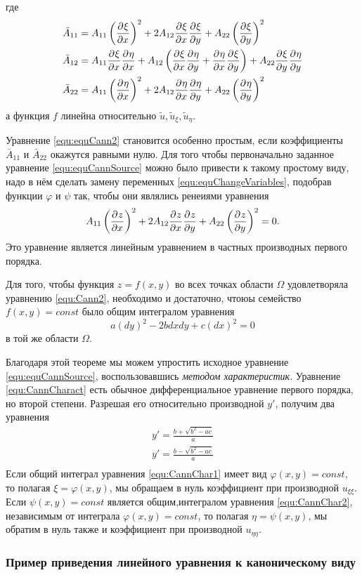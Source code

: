где 
\begin{align*}
	&\bar A_{11} = A_{11} \left(\frac{\partial^{}\xi}{\partial x^{}} \right)^2 + 2 A_{12} \frac{\partial^{}\xi}{\partial x^{}} \frac{\partial^{}\xi}{\partial y^{}} + A_{22} \left(\frac{\partial^{}\xi}{\partial y^{}} \right)^2\\
	&\bar A_{12} = A_{11} \frac{\partial^{}\xi}{\partial x^{}} \frac{\partial^{}\eta}{\partial x^{}} + A_{12} \left( \frac{\partial^{}\xi}{\partial x^{}} \frac{\partial^{}\eta}{\partial y^{}} + \frac{\partial^{}\eta}{\partial x^{}} \frac{\partial^{}\xi}{\partial y^{}} \right) + A_{22} \frac{\partial^{}\xi}{\partial y^{}} \frac{\partial^{}\eta}{\partial y^{}}\\
	&\bar A_{22} = A_{11} \left(\frac{\partial^{}\eta}{\partial x^{}} \right)^2 + 2 A_{12} \frac{\partial^{}\eta}{\partial x^{}} \frac{\partial^{}\eta}{\partial y^{}} + A_{22} \left(\frac{\partial^{}\eta}{\partial y^{}} \right)^2
\end{align*}
а функция $f$ линейна относительно $\tilde u, \tilde u_\xi, \tilde u_\eta$.

Уравнение \eqref{equ:equCann2} становится особенно простым, если коэффициенты $\bar A_{11}$ и $\bar A_{22}$ окажутся равными нулю. Для того чтобы первоначально заданное уравнение \eqref{equ:equCannSource} можно было привести к такому простому виду, надо в нём сделать замену переменных \eqref{equ:equChangeVariables}, подобрав функции $\varphi$ и $\psi$ так, чтобы они являлись ренеиями уравнения
\begin{equation}
	A_{11} \left(\frac{\partial^{}z}{\partial x^{}} \right)^2 + 2 A_{12} \frac{\partial^{}z}{\partial x^{}} \frac{\partial^{}z}{\partial y^{}} + A_{22}\left( \frac{\partial^{}z}{\partial y^{}}\right)^2 = 0.
	\label{equ:Cann2}
\end{equation}
Это уравнение является линейным уравнением в частных производных первого порядка. 
\begin{theo}
	Для того, чтобы функция $z = f(x, y)$ во всех точках области $\Omega$ удовлетворяла уравнению \eqref{equ:Cann2}, необходимо и достаточно, чтоюы семейство $f(x, y) = const$ было общим интегралом уравнения 
\begin{equation}
	a (dy)^2 - 2 b dx dy + c (dx)^2 = 0
	\label{equ:CannCharact}
\end{equation}
в той же области $\Omega$.
\end{theo}
Благодаря этой теореме мы можем упростить исходное уравнение \eqref{equ:equCannSource}, воспользовавшись \textit{методом характеристик}. Уравнение \eqref{equ:CannCharact} есть обычное дифференциальное уравнение первого порядка, но второй степени. Разрешая его относительно производной $y'$, получим два уравнения
\begin{align}
	y' = \frac{b + \sqrt{b^2 - ac}}{a} \label{equ:CannChar1}\\
	y' = \frac{b - \sqrt{b^2 - ac}}{a} \label{equ:CannChar2}\\
\end{align}
Если общий интеграл уравнения \eqref{equ:CannChar1} имеет вид $\varphi(x, y) = const$, то полагая $\xi = \varphi(x, y)$, мы обращаем в нуль коэффициент при производной $u_{\xi \xi}$. Если $\psi(x, y) = const$ является общим,интегралом уравнения \eqref{equ:CannChar2}, независимым от интеграла $\varphi(x, y) = const$, то полагая $\eta = \psi (x, y)$, мы обратим в нуль также и коэффициент при производной $u_{\eta \eta}$.

\newpage
\subsubsection{Пример приведения линейного уравнения к каноническому виду}
		 \newpage 	
